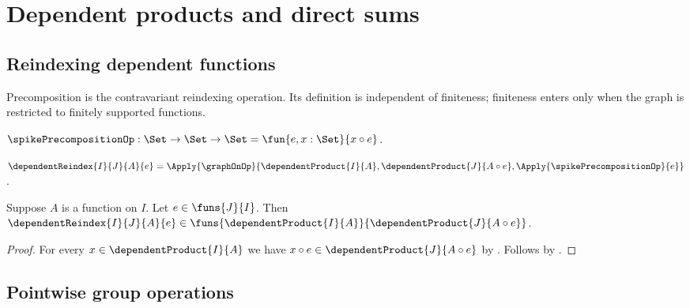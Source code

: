 






\section{Dependent products and direct sums}

\subsection{Reindexing dependent functions}

Precomposition is the contravariant reindexing operation.  Its definition is
independent of finiteness; finiteness enters only when the graph is restricted
to finitely supported functions.

\begin{definition}\label{spike_precomposition_op}
    $\spikePrecompositionOp:\Set\to\Set\to\Set
        =\fun{e,x:\Set}{x\circ e}$.
\end{definition}

\begin{definition}\label{spike_dependent_reindex}
    $\dependentReindex{I}{J}{A}{e}
        =\Apply{\graphOnOp}{
            \dependentProduct{I}{A},
            \dependentProduct{J}{A\circ e},
            \Apply{\spikePrecompositionOp}{e}}$.
\end{definition}

\begin{proposition}\label{spike_dependent_reindex_type}
    Suppose $A$ is a function on $I$.
    Let $e\in\funs{J}{I}$.
    Then
        $\dependentReindex{I}{J}{A}{e}\in
            \funs{\dependentProduct{I}{A}}{
                \dependentProduct{J}{A\circ e}}$.
\end{proposition}
\begin{proof}
    For every $x\in\dependentProduct{I}{A}$ we have
        $x\circ e\in\dependentProduct{J}{A\circ e}$ by
        .
    Follows by
        .
\end{proof}

\subsection{Pointwise group operations}

